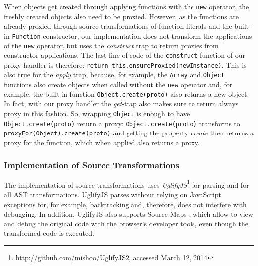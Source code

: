 When objects get created through applying functions with the \lstinline{new} operator, the freshly created objects also need to be proxied.
However, as the functions are already proxied through source transformations of function literals and the built-in \lstinline{Function} constructor, our implementation does not transform the applications of the \lstinline{new} operator, but uses the \emph{construct} trap to return proxies from constructor applications.
The last line of code of the \lstinline{construct} function of our proxy handler is therefore: \lstinline{return this.ensureProxied(newInstance)}.
This is also true for the \emph{apply} trap, because, for example, the \lstinline{Array} and \lstinline{Object} functions also create objects when called without the \lstinline{new} operator and, for example, the built-in function \lstinline{Object.create(proto)} also returns a new object.
In fact, with our proxy handler the \emph{get}-trap also makes sure to return always proxy in this fashion.
So, wrapping \lstinline{Object} is enough to have \lstinline{Object.create(proto)} return a proxy: \lstinline{Object.create(proto)} transforms to \lstinline{proxyFor(Object).create(proto)} and getting the property \emph{create} then returns a proxy for the function, which when applied also returns a proxy.



\subsubsection{Implementation of Source Transformations}


The implementation of source transformations uses \emph{UglifyJS}\footnote{\url{http://github.com/mishoo/UglifyJS2}, accessed March 12, 2014} for parsing and for all AST transformations.
UglifyJS parses without relying on JavaScript exceptions for, for example, backtracking and, therefore, does not interfere with debugging.
In addition, UglifyJS also supports Source Maps , which allow to view and debug the original code with the browser's developer tools, even though the transformed code is executed.













